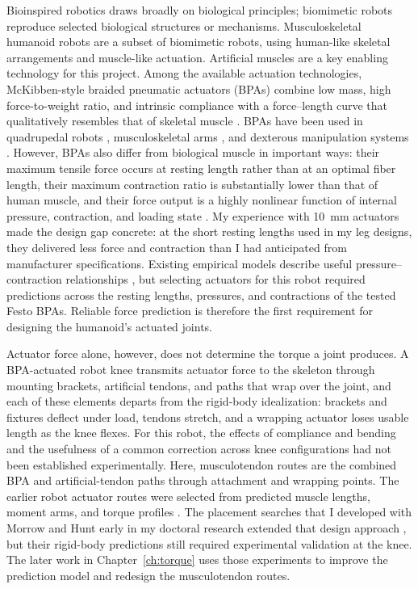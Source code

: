 Bioinspired robotics draws broadly on biological principles; biomimetic robots reproduce selected biological structures or mechanisms. Musculoskeletal humanoid robots are a subset of biomimetic robots, using human-like skeletal arrangements and muscle-like actuation. Artificial muscles are a key enabling technology for this project. Among the available actuation technologies, McKibben-style braided pneumatic actuators (BPAs) combine low mass, high force-to-weight ratio, and intrinsic compliance with a force--length curve that qualitatively resembles that of skeletal muscle \citep{liang_comparative_2020, hunt_modeling_2017}. BPAs have been used in quadrupedal robots \citep{aschenbeck_design_2006, hunt_modeling_2017, scharzenberger_design_2019}, musculoskeletal arms \citep{hitzmann_anthropomorphic_2018, kurumaya_musculoskeletal_2016}, and dexterous manipulation systems \citep{chen_realizing_2019}. However, BPAs also differ from biological muscle in important ways: their maximum tensile force occurs at resting length rather than at an optimal fiber length, their maximum contraction ratio is substantially lower than that of human muscle, and their force output is a highly nonlinear function of internal pressure, contraction, and loading state \citep{hunt_modeling_2017, sarosi_comparative_2017, liang_comparative_2020}. My experience with \qty{10}{\mm} actuators made the design gap concrete: at the short resting lengths used in my leg designs, they delivered less force and contraction than I had anticipated from manufacturer specifications. Existing empirical models describe useful pressure--contraction relationships \citep{sarosi_comparative_2017, martens_modeling_2017, hunt_modeling_2017}, but selecting actuators for this robot required predictions across the resting lengths, pressures, and contractions of the tested Festo BPAs. Reliable force prediction is therefore the first requirement for designing the humanoid's actuated joints.

Actuator force alone, however, does not determine the torque a joint produces. A BPA-actuated robot knee transmits actuator force to the skeleton through mounting brackets, artificial tendons, and paths that wrap over the joint, and each of these elements departs from the rigid-body idealization: brackets and fixtures deflect under load, tendons stretch, and a wrapping actuator loses usable length as the knee flexes. For this robot, the effects of compliance and bending and the usefulness of a common correction across knee configurations had not been established experimentally. Here, musculotendon routes are the combined BPA and artificial-tendon paths through attachment and wrapping points. The earlier robot actuator routes were selected from predicted muscle lengths, moment arms, and torque profiles \citep{bolen_determination_2019}. The placement searches that I developed with Morrow and Hunt early in my doctoral research extended that design approach \citep{morrow_optimization_2020}, but their rigid-body predictions still required experimental validation at the knee. The later work in Chapter~\ref{ch:torque} uses those experiments to improve the prediction model and redesign the musculotendon routes.

